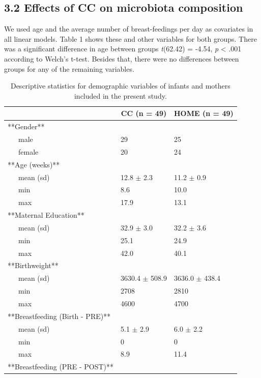 \documentclass[,man]{apa6}
\begin{document}
\subsection{3.2 Effects of CC on microbiota
composition}\label{effects-of-cc-on-microbiota-composition}

We used age and the average number of breast-feedings per day as
covariates in all linear models. Table 1 shows these and other variables
for both groups. There was a significant difference in age between
groups \emph{t}(62.42) = -4.54, \emph{p} \textless{} .001 according to
Welch's t-test. Besides that, there were no differences between groups
for any of the remaining variables.

\begin{table}[tbp]
\begin{center}
\begin{threeparttable}
\caption{\label{tab:unnamed-chunk-8}Descriptive statistics for demographic variables of infants and mothers included in the present study.}
\begin{tabular}{lll}
\toprule
 & \multicolumn{1}{c}{CC (n = 49)} & \multicolumn{1}{c}{HOME (n = 49)}\\
\midrule
**Gender** &  & \\
\ \ \ male & 29 & 25\\
\ \ \ female & 20 & 24\\
**Age (weeks)** &  & \\
\ \ \ mean (sd) & 12.8 $\pm$ 2.3 & 11.2 $\pm$ 0.9\\
\ \ \ min & 8.6 & 10.0\\
\ \ \ max & 17.9 & 13.1\\
**Maternal Education** &  & \\
\ \ \ mean (sd) & 32.9 $\pm$ 3.0 & 32.2 $\pm$ 3.6\\
\ \ \ min & 25.1 & 24.9\\
\ \ \ max & 42.0 & 40.1\\
**Birthweight** &  & \\
\ \ \ mean (sd) & 3630.4 $\pm$ 508.9 & 3636.0 $\pm$ 438.4\\
\ \ \ min & 2708 & 2810\\
\ \ \ max & 4600 & 4700\\
**Breastfeeding (Birth - PRE)** &  & \\
\ \ \ mean (sd) & 5.1 $\pm$ 2.9 & 6.0 $\pm$ 2.2\\
\ \ \ min & 0 & 0\\
\ \ \ max & 8.9 & 11.4\\
**Breastfeeding (PRE - POST)** &  & \\

\end{tabular}
\end{threeparttable}
\end{center}
\end{table}
\end{document}
